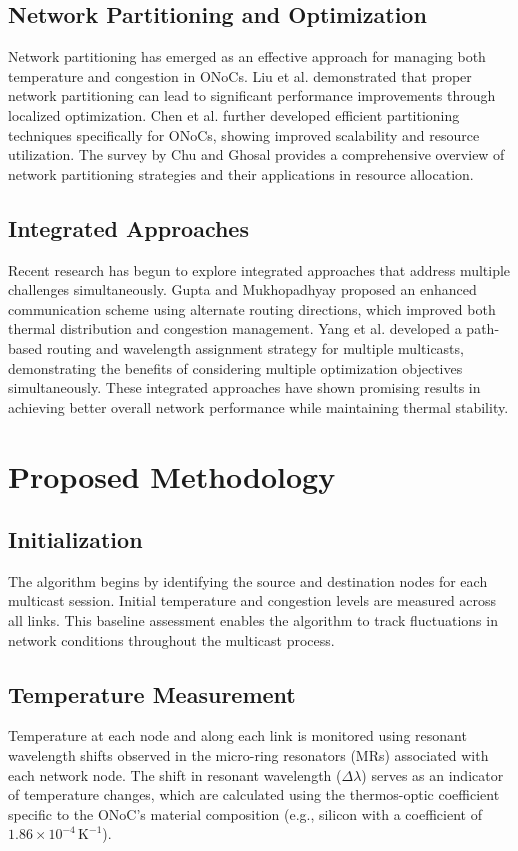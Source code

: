 \documentclass[conference]{IEEEtran}
\begin{document}
\subsection{Network Partitioning and Optimization}
Network partitioning has emerged as an effective approach for managing both temperature and congestion in ONoCs. Liu et al. \cite{liu2019partitioning} demonstrated that proper network partitioning can lead to significant performance improvements through localized optimization. Chen et al. \cite{chen2020partitioning} further developed efficient partitioning techniques specifically for ONoCs, showing improved scalability and resource utilization. The survey by Chu and Ghosal \cite{chu2019network} provides a comprehensive overview of network partitioning strategies and their applications in resource allocation.

\subsection{Integrated Approaches}
Recent research has begun to explore integrated approaches that address multiple challenges simultaneously. Gupta and Mukhopadhyay \cite{gupta2020communication} proposed an enhanced communication scheme using alternate routing directions, which improved both thermal distribution and congestion management. Yang et al. \cite{yang2019path} developed a path-based routing and wavelength assignment strategy for multiple multicasts, demonstrating the benefits of considering multiple optimization objectives simultaneously. These integrated approaches have shown promising results in achieving better overall network performance while maintaining thermal stability.

\section{Proposed Methodology}

\subsection{Initialization}
The algorithm begins by identifying the source and destination nodes for each multicast session. Initial temperature and congestion levels are measured across all links. This baseline assessment enables the algorithm to track fluctuations in network conditions throughout the multicast process.

\subsection{Temperature Measurement}
Temperature at each node and along each link is monitored using resonant wavelength shifts observed in the micro-ring resonators (MRs) associated with each network node. The shift in resonant wavelength (\(\Delta \lambda\)) serves as an indicator of temperature changes, which are calculated using the thermos-optic coefficient specific to the ONoC's material composition (e.g., silicon with a coefficient of \(1.86 \times 10^{-4} \, \mathrm{K}^{-1}\)).
\end{document}
